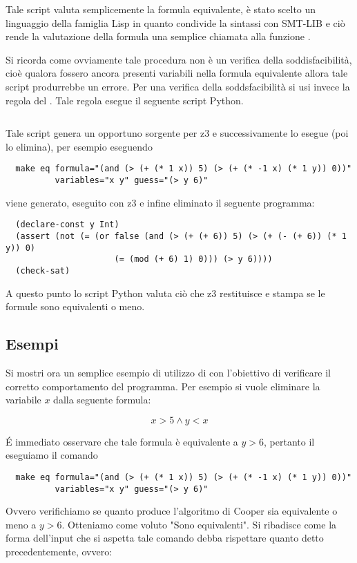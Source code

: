 \documentclass[11pt,letterpaper,twoside]{article}
\begin{document}
Tale script valuta semplicemente la formula equivalente, è stato scelto un
linguaggio della famiglia Lisp in quanto condivide la sintassi con
SMT-LIB e ciò rende la valutazione della formula una semplice chiamata alla
funzione .

Si ricorda come ovviamente tale procedura non è un verifica della
soddisfacibilità, cioè qualora fossero ancora presenti variabili nella formula
equivalente allora tale script produrrebbe un errore. Per una verifica della
soddsfacibilità si usi invece la regola  del .
Tale regola esegue il seguente script Python\autocite{python}.

\inputminted[linenos]{python}{../eq.py}

Tale script genera un opportuno sorgente per
z3\autocite{yices} e successivamente lo esegue (poi lo elimina), per esempio eseguendo

\begin{verbatim}
  make eq formula="(and (> (+ (* 1 x)) 5) (> (+ (* -1 x) (* 1 y)) 0))"
          variables="x y" guess="(> y 6)"
\end{verbatim}

viene generato, eseguito con z3 e infine eliminato il seguente programma:

\begin{verbatim}
  (declare-const y Int)
  (assert (not (= (or false (and (> (+ (+ 6)) 5) (> (+ (- (+ 6)) (* 1 y)) 0)
                      (= (mod (+ 6) 1) 0))) (> y 6))))
  (check-sat)
\end{verbatim}

A questo punto lo script Python valuta ciò che z3 restituisce e stampa se le formule
sono equivalenti o meno.

\subsection{Esempi}
Si mostri ora un semplice esempio di utilizzo di  con l'obiettivo
di verificare il corretto comportamento del programma.
Per esempio si vuole eliminare la variabile $x$ dalla seguente formula:

$$ x > 5 \land y < x $$

\'E immediato osservare che tale formula è equivalente a $y > 6$, pertanto il eseguiamo
il comando
\begin{verbatim}
  make eq formula="(and (> (+ (* 1 x)) 5) (> (+ (* -1 x) (* 1 y)) 0))"
          variables="x y" guess="(> y 6)"
\end{verbatim}
Ovvero verifichiamo se quanto produce l'algoritmo di Cooper sia equivalente o meno a $y > 6$.
Otteniamo come voluto "Sono equivalenti".
Si ribadisce come la forma dell'input che si aspetta tale comando debba rispettare quanto
detto precedentemente, ovvero:
\end{document}
